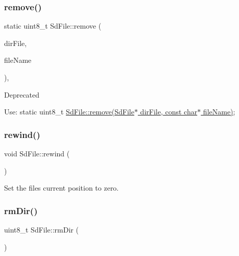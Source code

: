 \subsubsection{\texorpdfstring{remove()}{remove()}\hspace{0.1cm}{\footnotesize\ttfamily [3/3]}}
{\footnotesize\ttfamily static uint8\+\_\+t Sd\+File\+::remove (\begin{DoxyParamCaption}\item[{\hyperlink{class_sd_file}{Sd\+File} \&}]{dir\+File,  }\item[{const char $\ast$}]{file\+Name }\end{DoxyParamCaption})\hspace{0.3cm}{\ttfamily [inline]}, {\ttfamily [static]}}

\begin{DoxyRefDesc}{Deprecated}
\item[\hyperlink{deprecated__deprecated000011}{Deprecated}]Use\+: static uint8\+\_\+t \hyperlink{class_sd_file_ab932b7896dce90a29031f3a9039807a2}{Sd\+File\+::remove(\+Sd\+File$\ast$ dir\+File, const char$\ast$ file\+Name)}; \end{DoxyRefDesc}
\mbox{\label{class_sd_file_afa8aaa7bdeb97b4e691ea01adf99f654}} 
\subsubsection{\texorpdfstring{rewind()}{rewind()}}
{\footnotesize\ttfamily void Sd\+File\+::rewind (\begin{DoxyParamCaption}\item[{void}]{ }\end{DoxyParamCaption})\hspace{0.3cm}{\ttfamily [inline]}}

Set the file\textquotesingle{}s current position to zero. \mbox{\label{class_sd_file_a0d9e0c280b3469bb15e7258f6339746b}} 
\subsubsection{\texorpdfstring{rm\+Dir()}{rmDir()}}
{\footnotesize\ttfamily uint8\+\_\+t Sd\+File\+::rm\+Dir (\begin{DoxyParamCaption}\item[{void}]{ }\end{DoxyParamCaption})}


